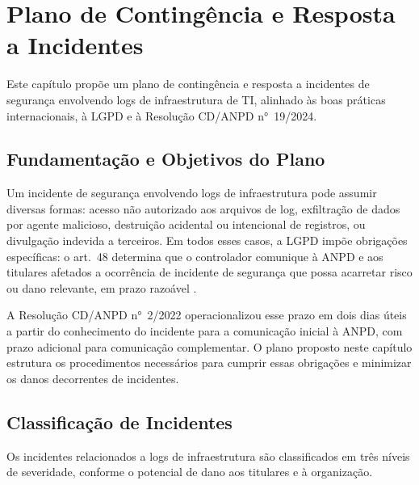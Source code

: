 
\chapter{Plano de Contingência e Resposta a Incidentes}
\label{cap:contingencia}

Este capítulo propõe um plano de contingência e resposta a incidentes de segurança envolvendo logs de infraestrutura de TI, alinhado às boas práticas internacionais, à LGPD e à Resolução CD/ANPD n°~19/2024.

\section{Fundamentação e Objetivos do Plano}
\label{sec:fund-plano}

Um incidente de segurança envolvendo logs de infraestrutura pode assumir diversas formas: acesso não autorizado aos arquivos de log, exfiltração de dados por agente malicioso, destruição acidental ou intencional de registros, ou divulgação indevida a terceiros. Em todos esses casos, a LGPD impõe obrigações específicas: o art.\ 48 determina que o controlador comunique à ANPD e aos titulares afetados a ocorrência de incidente de segurança que possa acarretar risco ou dano relevante, em prazo razoável \cite{brasil2018lgpd}.

A Resolução CD/ANPD n°~2/2022 operacionalizou esse prazo em dois dias úteis a partir do conhecimento do incidente para a comunicação inicial à ANPD, com prazo adicional para comunicação complementar. O plano proposto neste capítulo estrutura os procedimentos necessários para cumprir essas obrigações e minimizar os danos decorrentes de incidentes.

\section{Classificação de Incidentes}
\label{sec:classificacao-incidentes}

Os incidentes relacionados a logs de infraestrutura são classificados em três níveis de severidade, conforme o potencial de dano aos titulares e à organização.

